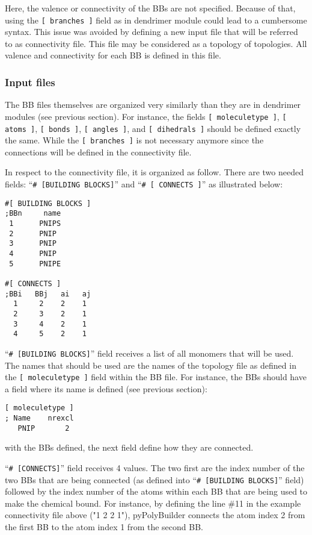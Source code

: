 \documentclass[12pt]{article}
\begin{document}
Here, the valence or connectivity of the BBs are not specified.
Because of that, using the \texttt{[ branches ]} field as in dendrimer module could lead to a cumbersome syntax.
This issue was avoided by defining a new input file that will be referred to as connectivity file.
This file may be considered as a topology of topologies.
All valence and connectivity for each BB is defined in this file.

\subsubsection{Input files}
\label{sec:GENinputFiles}

The BB files themselves are organized very similarly than they are in dendrimer modules (see previous section).
For instance, the fields \texttt{[ moleculetype ]}, \texttt{[ atoms ]}, \texttt{[ bonds ]}, \texttt{[ angles ]}, and \texttt{[ dihedrals ]} should be defined exactly the same. 
While the \texttt{[ branches ]} is not necessary anymore since the connections will be defined in the connectivity file.

In respect to the connectivity file, it is organized as follow.
There are two needed fields: ``\texttt{\# [BUILDING BLOCKS]}'' and ``\texttt{\# [ CONNECTS ]}'' as illustrated below:

\begin{lstlisting}
#[ BUILDING BLOCKS ]
;BBn     name
 1      PNIPS
 2      PNIP
 3      PNIP
 4      PNIP
 5      PNIPE

#[ CONNECTS ]
;BBi   BBj   ai   aj
  1     2    2    1
  2     3    2    1
  3     4    2    1
  4     5    2    1
\end{lstlisting}

``\texttt{\# [BUILDING BLOCKS]}'' field receives a list of all monomers that will be used.
The names that should be used are the names of the topology file as defined in the \texttt{[ moleculetype ]} field within the BB file.
For instance, the BBs should have a field where its name is defined (see previous section):
\begin{lstlisting}
[ moleculetype ]
; Name    nrexcl
   PNIP       2
\end{lstlisting}
with the BBs defined, the next field define how they are connected.

``\texttt{\# [CONNECTS]}'' field receives 4 values.
The two first are the index number of the two BBs that are being connected (as defined into ``\texttt{\# [BUILDING BLOCKS]}'' field) followed by the index number of the atoms within each BB that are being used to make the chemical bound.
For instance, by defining the line \#11 in the example connectivity file above ("1   2   2    1"), pyPolyBuilder connects the atom index 2 from the first BB to the atom index 1 from the second BB.
\end{document}
